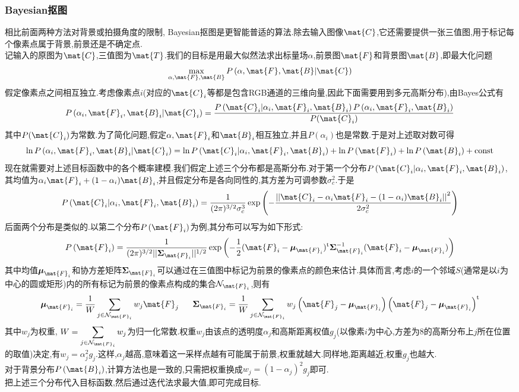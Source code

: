 \documentclass{ctexart}
\begin{document}
\subsubsection{Bayesian抠图}
相比前面两种方法对背景或拍摄角度的限制, Bayesian抠图是更智能普适的算法.除去输入图像$\mat{C}$,它还需要提供一张三值图,用于标记每个像素点属于背景,前景还是不确定点.\\
\indent 记输入的原图为$\mat{C}$,三值图为$\mat{T}$.我们的目标是用最大似然法求出标量场$\alpha$,前景图$\mat{F}$和背景图$\mat{B}$,即最大化问题
\[\max_{\alpha,\mat{F},\mat{B}}P\left(\alpha,\mat{F},\mat{B}|\mat{C}\right)\]
假定像素点之间相互独立.考虑像素点$i$(对应的$\mat{C}_i$等都是包含RGB通道的三维向量,因此下面需要用到多元高斯分布),由Bayes公式有
\[P\left(\alpha_i,\mat{F}_i,\mat{B}_i|\mat{C}_i\right)=\dfrac{P\left(\mat{C}_i|\alpha_i,\mat{F}_i,\mat{B}_i\right)P\left(\alpha_i,\mat{F}_i,\mat{B}_i\right)}{P(\mat{C}_i)}\]
其中$P(\mat{C}_i)$为常数.为了简化问题,假定$\alpha,\mat{F}_i$和$\mat{B}_i$相互独立,并且$P\left(\alpha_i\right)$也是常数.于是对上述取对数可得
\[\ln P\left(\alpha_i,\mat{F}_i,\mat{B}_i|\mat{C}_i\right)=\ln P\left(\mat{C}_i|\alpha_i,\mat{F}_i,\mat{B}_i\right)+\ln P\left(\mat{F}_i\right)+\ln P\left(\mat{B}_i\right)+\text{const}\]
\indent 现在就需要对上述目标函数中的各个概率建模.我们假定上述三个分布都是高斯分布.对于第一个分布$P\left(\mat{C}_i|\alpha_i,\mat{F}_i,\mat{B}_i\right)$,其均值为$\alpha_i\mat{F}_i+(1-\alpha_i)\mat{B}_i$,并且假定分布是各向同性的,其方差为可调参数$\sigma_c^2$.于是
\[P\left(\mat{C}_i|\alpha_i,\mat{F}_i,\mat{B}_i\right)=\dfrac{1}{(2\pi)^{3/2}\sigma_c^3}\exp\left(-\dfrac{\left|\left|\mat{C}_i-\alpha_i\mat{F}_i-(1-\alpha_i)\mat{B}_i\right|\right|^2}{2\sigma_c^2}\right)\]
后面两个分布是类似的.以第二个分布$P\left(\mat{F}_i\right)$为例,其分布可以写为如下形式:
\[P\left(\mat{F}_i\right)=\dfrac{1}{(2\pi)^{3/2}||\boldsymbol{\Sigma}_{\mat{F}_i}||^{1/2}}\exp\left(-\dfrac{1}{2}(\mat{F}_i-\boldsymbol{\mu}_{\mat{F}_i})^{\text{t}}\boldsymbol{\Sigma}_{\mat{F}_i}^{-1}(\mat{F}_i-\boldsymbol{\mu}_{\mat{F}_i})\right)\]
其中均值$\boldsymbol{\mu}_{\mat{F}_i}$和协方差矩阵$\boldsymbol{\Sigma}_{\mat{F}_i}$可以通过在三值图中标记为前景的像素点的颜色来估计.具体而言,考虑$i$的一个邻域$S$(通常是以$i$为中心的圆或矩形)内的所有标记为前景的像素点构成的集合$\mathcal{N}_{\mat{F}_i}$,则有
\[\boldsymbol{\mu}_{\mat{F}_i}=\dfrac{1}{W}\sum_{j\in\mathcal{N}_{\mat{F}_i}}w_j\mat{F}_j\ \ \ \ \ \boldsymbol{\Sigma}_{\mat{F}_i}=\dfrac{1}{W}\sum_{j\in\mathcal{N}_{\mat{F}_i}}w_j\left(\mat{F}_j-\boldsymbol{\mu}_{\mat{F}_i}\right)\left(\mat{F}_j-\boldsymbol{\mu}_{\mat{F}_i}\right)^{\text{t}}\]
其中$w_j$为权重, $W=\displaystyle\sum_{j\in\mathcal{N}_{\mat{F}_i}}w_j$为归一化常数.权重$w_j$由该点的透明度$\alpha_j$和高斯距离权值$g_j$(以像素$i$为中心,方差为$8$的高斯分布上$j$所在位置的取值)决定,有$w_j=\alpha_j^2g_j$.这样,$\alpha_j$越高,意味着这一采样点越有可能属于前景,权重就越大.同样地,距离越近,权重$g_j$也越大.\\
\indent 对于背景分布$P\left(\mat{B}_i\right)$,计算方法也是一致的,只需把权重换成$w_j=(1-\alpha_j)^2g_j$即可.\\
\indent 把上述三个分布代入目标函数,然后通过迭代法求最大值,即可完成目标.
\end{document}

